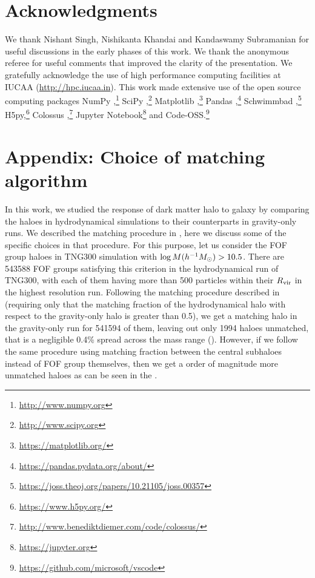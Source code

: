 \section*{Acknowledgments}
We thank Nishant Singh, Nishikanta Khandai and Kandaswamy Subramanian for useful discussions in the early phases of this work.
We thank the anonymous referee for useful comments that improved the clarity of the presentation.
We gratefully acknowledge the use of high performance computing facilities at IUCAA (\url{http://hpc.iucaa.in}). This work made extensive use of the open source computing packages NumPy \citep{vanderwalt-numpy},\footnote{\url{http://www.numpy.org}} SciPy \citep{scipy},\footnote{\url{http://www.scipy.org}} Matplotlib \citep{hunter07_matplotlib},\footnote{\url{https://matplotlib.org/}} Pandas \citep[][]{reback2020pandas},\footnote{\url{https://pandas.pydata.org/about/}} Schwimmbad \citep{schwimmbad},\footnote{\url{https://joss.theoj.org/papers/10.21105/joss.00357}} H5py,\footnote{\url{https://www.h5py.org/}} Colossus \citep{colossus},\footnote{\url{http://www.benediktdiemer.com/code/colossus/}}  Jupyter Notebook\footnote{\url{https://jupyter.org}} and Code-OSS.\footnote{\url{https://github.com/microsoft/vscode}}



% 

\section{Appendix: Choice of matching algorithm}
\label{sec:apndx-matching-ch:simbase}
In this work, we studied the response of dark matter halo to galaxy by comparing the haloes in hydrodynamical simulations to their counterparts in gravity-only runs. We described the matching procedure in , here we discuss some of the specific choices in that procedure.
For this purpose, let us consider the FOF group haloes in TNG300 simulation with $\log M(h^{-1}M_{\odot})>10.5$.  There are 543588 FOF groups satisfying this criterion in the hydrodynamical run of TNG300, with each of them having more than 500 particles within their $R_{\rm vir}$ in the highest resolution run.
Following the matching procedure described in  (requiring only that the matching fraction of the hydrodynamical halo with respect to the gravity-only halo is greater than 0.5), we get a matching halo in the gravity-only run for 541594 of them, leaving out only 1994 haloes unmatched, that is a negligible 0.4\% spread across the mass range ().
However, if we follow the same procedure using matching fraction between the central subhaloes instead of FOF group themselves, then we get a order of magnitude more unmatched haloes as can be seen in the .  

